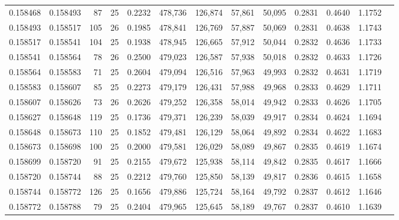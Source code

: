 \begin{tabular}{rrrrrrrrrrrrr}
0.158468 & 0.158493 &    87 &  25 &                                     0.2232 & 478,736 & 126,874 &  57,861 &  50,095 & 0.2831 & 0.4640 & 1.1752 \\
0.158493 & 0.158517 &   105 &  26 &                                     0.1985 & 478,841 & 126,769 &  57,887 &  50,069 & 0.2831 & 0.4638 & 1.1743 \\
0.158517 & 0.158541 &   104 &  25 &                                     0.1938 & 478,945 & 126,665 &  57,912 &  50,044 & 0.2832 & 0.4636 & 1.1733 \\
0.158541 & 0.158564 &    78 &  26 &                                     0.2500 & 479,023 & 126,587 &  57,938 &  50,018 & 0.2832 & 0.4633 & 1.1726 \\
0.158564 & 0.158583 &    71 &  25 &                                     0.2604 & 479,094 & 126,516 &  57,963 &  49,993 & 0.2832 & 0.4631 & 1.1719 \\
0.158583 & 0.158607 &    85 &  25 &                                     0.2273 & 479,179 & 126,431 &  57,988 &  49,968 & 0.2833 & 0.4629 & 1.1711 \\
0.158607 & 0.158626 &    73 &  26 &                                     0.2626 & 479,252 & 126,358 &  58,014 &  49,942 & 0.2833 & 0.4626 & 1.1705 \\
0.158627 & 0.158648 &   119 &  25 &                                     0.1736 & 479,371 & 126,239 &  58,039 &  49,917 & 0.2834 & 0.4624 & 1.1694 \\
0.158648 & 0.158673 &   110 &  25 &                                     0.1852 & 479,481 & 126,129 &  58,064 &  49,892 & 0.2834 & 0.4622 & 1.1683 \\
0.158673 & 0.158698 &   100 &  25 &                                     0.2000 & 479,581 & 126,029 &  58,089 &  49,867 & 0.2835 & 0.4619 & 1.1674 \\
0.158699 & 0.158720 &    91 &  25 &                                     0.2155 & 479,672 & 125,938 &  58,114 &  49,842 & 0.2835 & 0.4617 & 1.1666 \\
0.158720 & 0.158744 &    88 &  25 &                                     0.2212 & 479,760 & 125,850 &  58,139 &  49,817 & 0.2836 & 0.4615 & 1.1658 \\
0.158744 & 0.158772 &   126 &  25 &                                     0.1656 & 479,886 & 125,724 &  58,164 &  49,792 & 0.2837 & 0.4612 & 1.1646 \\
0.158772 & 0.158788 &    79 &  25 &                                     0.2404 & 479,965 & 125,645 &  58,189 &  49,767 & 0.2837 & 0.4610 & 1.1639 \\

\end{tabular}
